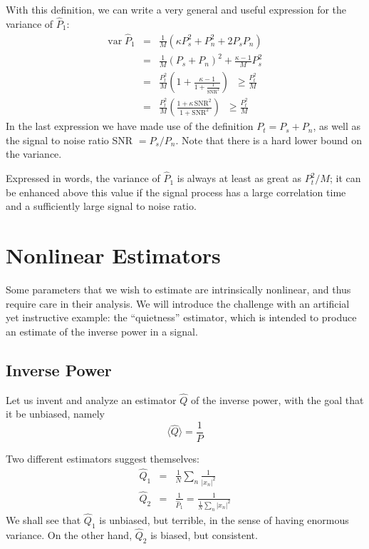 With this definition, we can write a very general and useful
expression for the variance of $\hat{P}_1$:
\begin{eqnarray}
\textrm{var}\;\hat{P}_1 &=& \frac{1}{M} \left( \kappa P_s^2 + P_n^2 +
  2 P_s P_n\right) \\
 &=& \frac{1}{M} \left(P_s + P_n\right)^2 + \frac{\kappa - 1}{M} P_s^2
 \\
&=& \frac{P_t^2}{M}\left(1 + \frac{\kappa - 1}{1 +
    \frac{1}{\textrm{SNR}^2}}\right) \;\; \ge \frac{P_t^2}{M} \\
&=&  \frac{P_t^2}{M}\left(\frac{1 + \kappa \,\textrm{SNR}^2}{1 +
    \textrm{SNR}^2}\right) \;\; \ge \frac{P_t^2}{M}
\end{eqnarray}
In the last expression we have made use of the definition $P_t = P_s +
P_n$, as well as the signal to noise ratio SNR $=P_s/P_n$.  Note that
there is a hard lower bound on the variance.

Expressed in words, the variance of $\hat{P}_1$ is always at least as
great as $P_t^2/M$; it can be enhanced above this value if the signal
process has a large correlation time and a sufficiently large signal
to noise ratio. 

\section{Nonlinear Estimators}

Some parameters that we wish to estimate are intrinsically nonlinear,
and thus require care in their analysis.  We will introduce the
challenge with an artificial yet instructive example: the
``quietness'' estimator, which is intended to produce an estimate of
the inverse power in a signal. 

\subsection{Inverse Power}

Let us invent and analyze an estimator $\hat{Q}$ of the inverse power,
with the goal that it be unbiased, namely 
\begin{displaymath}
\langle \hat{Q} \rangle = \frac{1}{P}
\end{displaymath}

Two different estimators suggest themselves:
\begin{eqnarray}
\hat Q_1 &=& \frac{1}{N} \sum_n \frac{1}{|x_n|^2} \\
\hat Q_2 &=& \frac{1}{\hat P_1} = \frac{1}{\frac{1}{N} \sum_n |x_n|^2}
\end{eqnarray} 
We shall see that $\hat Q_1$ is unbiased, but terrible, in the sense
of having enormous variance.  On the other hand, $\hat Q_2$ is biased,
but consistent.

